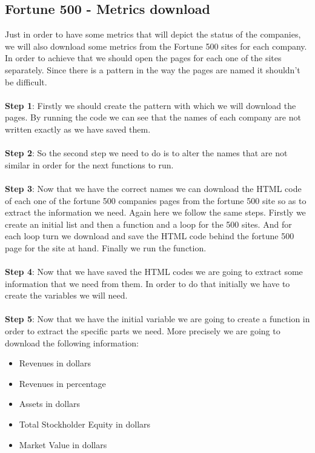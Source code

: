 \documentclass{book}
\begin{document}
\subsection{Fortune 500 - Metrics download}
Just in order to have some metrics that will depict the status of the companies, we will also download some metrics from the Fortune 500 sites for each company.\cite{key35} In order to achieve that we should open the pages for each one of the sites separately. Since there is a pattern in the way the pages are named it shouldn't be difficult.\\\\
\textbf{Step 1}: Firstly we should create the pattern with which we will download the pages. By running the code we can see that the names of each company are not written exactly as we have saved them.\\\\
\textbf{Step 2}: So the second step we need to do is to alter the names that are not similar in order for the next functions to run.\\\\
\textbf{Step 3}: Now that we have the correct names we can download the HTML code of each one of the fortune 500 companies pages from the fortune 500 site so as to extract the information we need. Again here we follow the same steps. Firstly we create an initial list and then a function and a loop for the 500 sites. And for each loop turn we download and save the HTML code behind the fortune 500 page for the site at hand. Finally we run the function.\\\\
\textbf{Step 4}: Now that we have saved the HTML codes we are going to extract some information that we need from them. In order to do that initially we have to create the variables we will need.\\\\
\textbf{Step 5}: Now that we have the initial variable we are going to create a function in order to extract the specific parts we need. More precisely we are going to download the following information:
\begin{itemize}
\item Revenues in dollars
\item Revenues in percentage
\item Assets in dollars
\item Total Stockholder Equity in dollars
\item Market Value in dollars
\end{itemize}
\end{document}
